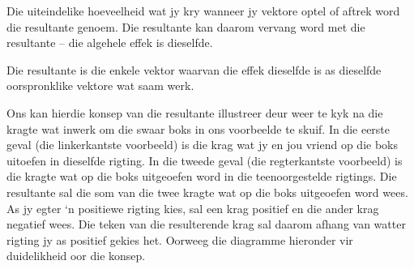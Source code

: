 \label{m38813*id188345}Die uiteindelike hoeveelheid wat jy kry wanneer jy vektore optel of aftrek word die resultante genoem. Die resultante kan daarom vervang word met die resultante – die algehele effek is dieselfde.\\

 {Die resultante is die enkele vektor waarvan die effek dieselfde is as dieselfde oorspronklike vektore wat saam werk. } 

Ons kan hierdie konsep van die resultante illustreer deur weer te kyk na die kragte wat inwerk om die swaar boks in ons voorbeelde te skuif. In die eerste geval (die linkerkantste voorbeeld) is die krag wat jy en jou vriend op die boks uitoefen in dieselfde rigting. In die tweede geval (die regterkantste voorbeeld) is die kragte wat op die boks uitgeoefen word in die teenoorgestelde rigtings. Die resultante sal die som van die twee kragte wat op die boks uitgeoefen word wees. As jy egter ‘n positiewe rigting kies, sal een krag positief en die ander krag negatief wees. Die teken van die resulterende krag sal daarom afhang van watter rigting jy as positief gekies het. Oorweeg die diagramme hieronder vir duidelikheid oor die konsep.\\

